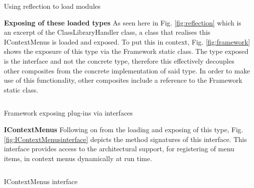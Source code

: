 		\begin{figurehere}
			\inputminted[linenos=true,fontsize=\footnotesize,tabsize=2]{csharp}{pages/chapter3/smippets/reflection}
			\caption{Using reflection to load modules}
			\label{fig:reflection}
		\end{figurehere}
		
		
		
		
		\large{\bfseries{Exposing of these loaded types}}
		\newline
		\normalsize
		{
			As seen here in Fig. \ref{fig:reflection} which is an excerpt of the ClassLibraryHandler class, a class that realises
			this IContextMenus is loaded and exposed.  To put this in context, Fig. \ref{fig:framework} shows the exposure of this 
			type via the Framework static class.  The type exposed is the interface and not the concrete type, therefore this effectively decouples 
			other composites from the concrete implementation of said type.  In order to make use of this functionality, other composites
			include a reference to the Framework static class.
		}

		\vspace{5mm}
		\begin{figurehere}
			\inputminted[linenos=true,fontsize=\footnotesize,tabsize=2]{csharp}{pages/chapter3/smippets/framework}
			\vspace{-5mm}
			\caption{Framework exposing plug-ins via interfaces}
			\label{fig:framework}
		\end{figurehere}
		
		
		
		
		
				
		\vspace{3mm}
		\large{\bfseries{IContextMenus}}
		\newline
		\normalsize
		{	
			Following on from the loading and exposing of this type, Fig. \ref{fig:IContextMenusinterface} depicts the method signatures of this interface.
			This interface provides access to the architectural support, for registering of menu items, in context menus dynamically at run time.  
		}
				
		\vspace{4mm}
		\begin{figurehere}
			\inputminted[linenos=true,fontsize=\footnotesize,tabsize=2]{csharp}{pages/chapter3/smippets/IContextMenus.cs}
			\vspace{-5mm}
			\caption{IContextMenus interface}
			\label{fig:IContextMenusinterface}
		\end{figurehere}
		
